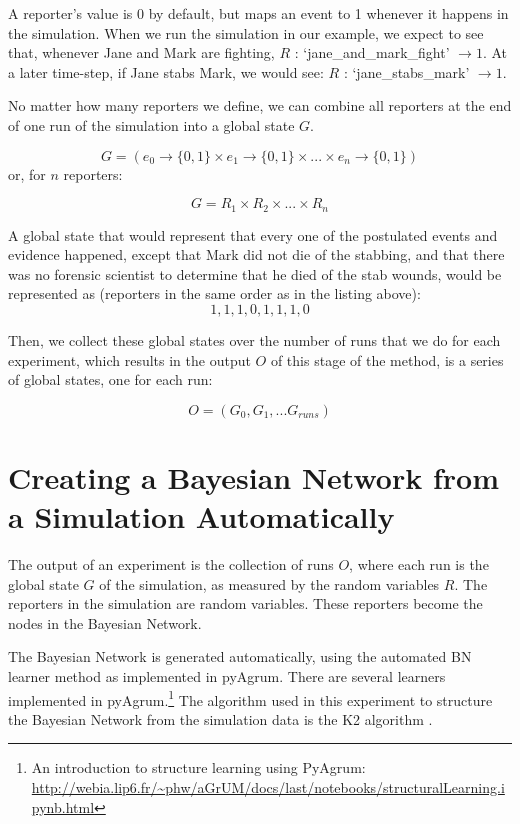 A reporter's value is 0 by default, but maps an event to 1 whenever it happens in the simulation. When we run the simulation in our example, we expect to see that, whenever Jane and Mark are fighting, $R$ : `jane\_and\_mark\_fight' $\rightarrow 1$. At a later time-step, if Jane stabs Mark, we would see: $R$ : `jane\_stabs\_mark' $\rightarrow 1$.

No matter how many reporters we define, we can combine all reporters at the end of one run of the simulation into a global state $G$.

\[ G = (e_0 \rightarrow \{0, 1\} \times e_1 \rightarrow \{0, 1\} \times ... \times e_n \rightarrow \{0, 1\})\]
 or, for $n$ reporters:
 
\[ G = R_1 \times R_2 \times... \times R_n\]


A global state that would represent that every one of the postulated events and evidence happened, except that Mark did not die of the stabbing, and that there was no forensic scientist to determine that he died of the stab wounds, would be represented as (reporters in the same order as in the listing above):
 \[1,1,1,0,1,1,1,0\]


Then, we collect these global states over the number of runs that we do for each experiment, which results in the output $O$ of this stage of the method, is a series of global states, one for each run:

\[ O = (G_0, G_1, ... G_{runs})\]



\section{Creating a Bayesian Network from a Simulation Automatically}

The output of an experiment is the collection of runs $O$, where each run is the global state $G$ of the simulation, as measured by the random variables $R$. The reporters in the simulation are random variables. These reporters become the nodes in the Bayesian Network.

The Bayesian Network is generated automatically, using the automated BN learner method as implemented in pyAgrum. There are several learners implemented in pyAgrum.\footnote{An introduction to structure learning using PyAgrum: \url{http://webia.lip6.fr/~phw/aGrUM/docs/last/notebooks/structuralLearning.ipynb.html}} The algorithm used in this experiment to structure the Bayesian Network from the simulation data is the K2 algorithm \citep{Cooper1992}. 


